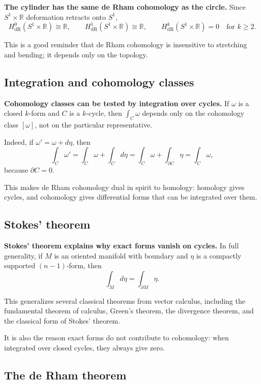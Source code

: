 \documentclass[12pt,a4paper]{article}
\theoremstyle{notespace}
\begin{document}
\textbf{The cylinder has the same de Rham cohomology as the circle.} Since \(S^1\times \mathbb{R}\) deformation retracts onto \(S^1\),
\[
H^0_{\mathrm{dR}}(S^1\times \mathbb{R})\cong \mathbb{R},
\qquad
H^1_{\mathrm{dR}}(S^1\times \mathbb{R})\cong \mathbb{R},
\qquad
H^k_{\mathrm{dR}}(S^1\times \mathbb{R})=0
\quad\text{for }k\ge 2.
\]

This is a good reminder that de Rham cohomology is insensitive to stretching and bending; it depends only on the topology.

\subsection{Integration and cohomology classes}

\textbf{Cohomology classes can be tested by integration over cycles.} If \(\omega\) is a closed \(k\)-form and \(C\) is a \(k\)-cycle, then \(\int_C \omega\) depends only on the cohomology class \([\omega]\), not on the particular representative.

Indeed, if \(\omega'=\omega+d\eta\), then
\[
\int_C \omega'
=
\int_C \omega+\int_C d\eta
=
\int_C \omega+\int_{\partial C}\eta
=
\int_C \omega,
\]
because \(\partial C=0\).

This makes de Rham cohomology dual in spirit to homology: homology gives cycles, and cohomology gives differential forms that can be integrated over them.

\subsection{Stokes' theorem}

\textbf{Stokes' theorem explains why exact forms vanish on cycles.} In full generality, if \(M\) is an oriented manifold with boundary and \(\eta\) is a compactly supported \((n-1)\)-form, then
\[
\int_M d\eta = \int_{\partial M}\eta.
\]

This generalizes several classical theorems from vector calculus, including the fundamental theorem of calculus, Green's theorem, the divergence theorem, and the classical form of Stokes' theorem.

It is also the reason exact forms do not contribute to cohomology: when integrated over closed cycles, they always give zero.

\subsection{The de Rham theorem}
\end{document}
